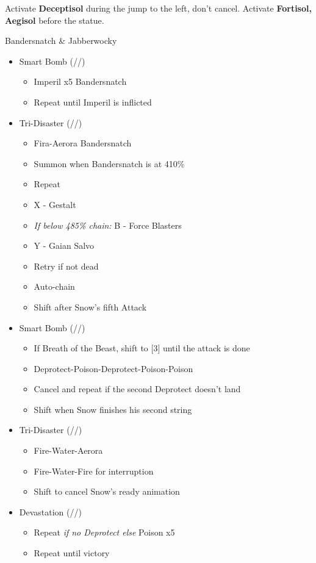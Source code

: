 	Activate \textbf{Deceptisol} during the jump to the left, don't cancel.
	Activate \textbf{Fortisol, Aegisol} before the statue.
	\vfill
	\renewcommand{\second}{[2] Devastation (\sab/\com/\com)}
	\renewcommand{\third}{[3] Premeditation (\sab/\sen/\syn)}
	\renewcommand{\fifth}{[5] Smart Bomb (\sab/\rav/\rav)}
	\renewcommand{\sixth}{[6] Tri-Disaster (\rav/\rav/\rav)}
	\begin{battle}[0:55]{Bandersnatch \& Jabberwocky}
		\begin{itemize}
			\item \fifth
			      \begin{itemize}
				      \item Imperil x5 Bandersnatch
				      \item Repeat until Imperil is inflicted
			      \end{itemize}
			\item \sixth
			      \begin{itemize}
					\item Fira-Aerora Bandersnatch
				      \item Summon when Bandersnatch is at 410\%
				      \item Repeat
				      \item X - Gestalt
				      \item {\it If below 485\% chain:} B - Force Blasters
				      \item Y - Gaian Salvo
				      \item Retry if not dead
				      \item Auto-chain
				      \item Shift after Snow's fifth Attack
			      \end{itemize}
			\item \fifth
			      \begin{itemize}
				      \item If Breath of the Beast, shift to [3] until the attack is done
				      \item Deprotect-Poison-Deprotect-Poison-Poison
				      \item Cancel and repeat if the second Deprotect doesn't land
				      \item Shift when Snow finishes his second string
			      \end{itemize}
			\item \sixth
			      \begin{itemize}
				      \item Fire-Water-Aerora
				      \item Fire-Water-Fire for interruption
				      \item Shift to cancel Snow's ready animation
			      \end{itemize}
			\item \second
			      \begin{itemize}
				      \item Repeat \textit{if no Deprotect else }Poison x5
				      \item Repeat until victory
			      \end{itemize}
		\end{itemize}
	\end{battle}
